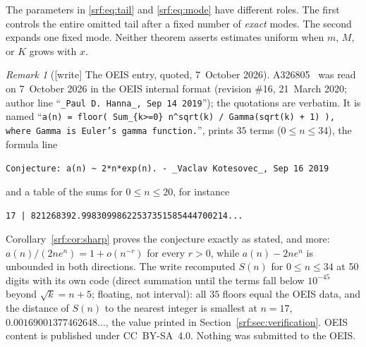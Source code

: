 \documentclass[11pt]{article}
\theoremstyle{remark}\newtheorem{remark}[theorem]{Remark}
\begin{document}
The parameters in \eqref{srf:eq:tail} and \eqref{srf:eq:mode} have different roles. The first controls the entire omitted tail after a fixed number of \emph{exact} modes. The second expands one fixed mode. Neither theorem asserts estimates uniform when $m$, $M$, or $K$ grows with $x$.

\begin{remark}[{[write]} The OEIS entry, quoted, 7~October 2026]\label{srf:rem:oeis}
A326805~\cite{oeis} was read on 7~October 2026 in the OEIS internal format
(revision \#16, 21~March 2020; author line
``\texttt{\_Paul D. Hanna\_, Sep 14 2019}''); the quotations are verbatim. It is
named ``\texttt{a(n) = floor( Sum\_\{k>=0\} n\^{}sqrt(k) / Gamma(sqrt(k) + 1) ), where
Gamma is Euler's gamma function.}'', prints $35$ terms ($0\le n\le34$), the
formula line
\begin{center}\small
\parbox{0.92\textwidth}{\raggedright\texttt{Conjecture: a(n) \textasciitilde{} 2*n*exp(n). - \_Vaclav Kotesovec\_, Sep 16 2019}}
\end{center}
and a table of the sums for $0\le n\le20$, for instance
\begin{center}\small
\parbox{0.92\textwidth}{\raggedright\texttt{17 | 821268392.99830998622537351585444700214...}}
\end{center}
Corollary~\ref{srf:cor:sharp}
proves the conjecture exactly as stated, and more:
$a(n)/(2ne^n)=1+o(n^{-r})$ for every $r>0$, while $a(n)-2ne^n$ is unbounded in
both directions. The write recomputed $S(n)$ for $0\le n\le34$ at 50 digits
with its own code (direct summation until the terms fall below $10^{-45}$
beyond $\sqrt k=n+5$; floating, not interval): all $35$ floors equal the OEIS
data, and the distance of $S(n)$ to the nearest integer is smallest at
$n=17$, $0.00169001377462648\ldots$, the value printed in
Section~\ref{srf:sec:verification}. OEIS content is published under
CC~BY-SA~4.0. Nothing was submitted to the OEIS.
\end{remark}
\end{document}
